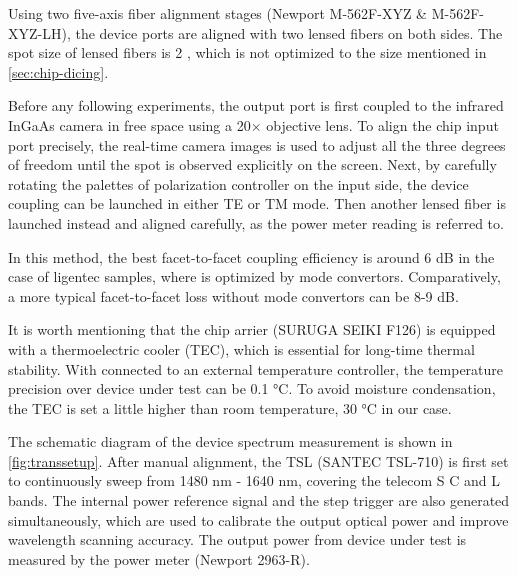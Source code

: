 Using two five-axis fiber alignment stages (Newport M-562F-XYZ \& M-562F-XYZ-LH), the device ports are aligned with two lensed fibers on both sides. The spot size of lensed fibers is 2 \um, which is not optimized to the size mentioned in \autoref{sec:chip-dicing}. 

Before any following experiments, the output port is first coupled to the infrared InGaAs camera in free space using a 20$\times$ objective lens. To align the chip input port precisely, the real-time camera images is used to adjust all the three degrees of freedom until the spot is observed explicitly on the screen. Next, by carefully rotating the palettes of polarization controller on the input side, the device coupling can be launched in either TE or TM mode. Then another lensed fiber is launched instead and aligned carefully, as the power meter reading is referred to.

In this method, the best facet-to-facet coupling efficiency is around 6 dB in the case of ligentec samples, where is optimized by mode convertors. Comparatively, a more typical facet-to-facet loss without mode convertors can be 8-9 dB.

It is worth mentioning that the chip arrier (SURUGA SEIKI F126) is equipped with a thermoelectric cooler (TEC), which is essential for long-time thermal stability. 
With connected to an external temperature controller, the temperature precision over device under test can be 0.1 \si{\celsius}.
To avoid moisture condensation, the TEC is set a little higher than room temperature, 30 \si{\celsius} in our case. 


\begin{figure}
	\centering
	
	\label{fig:transsetup}
\end{figure}

The schematic diagram of the device spectrum measurement is shown in \autoref{fig:transsetup}. 
After manual alignment, the TSL (SANTEC TSL-710) is first set to continuously sweep from 1480 nm - 1640 nm, covering the telecom S C and L bands.
The internal power reference signal and the step trigger are also generated simultaneously, which are used to calibrate the output optical power and improve wavelength scanning accuracy. The output power from device under test is measured by the power meter (Newport 2963-R). 

